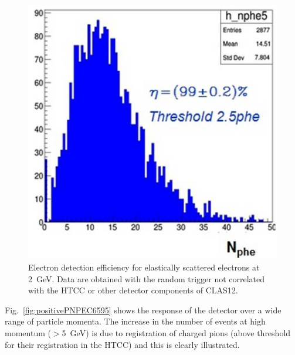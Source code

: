 \begin{figure}[!ht]
    \centering
    \includegraphics[width=1.0\linewidth,trim={0.0cm 0.0cm 0.0cm 0.0cm},clip]{images/RAFO_2GeV.jpg}
    \caption{Electron detection efficiency for elastically scattered electrons at 2~GeV. Data are obtained with the
      random trigger not correlated with the HTCC or other detector components of CLAS12.}
    \label{fig:RAFO_2GeV}
\end{figure}

Fig.~\ref{fig:positivePNPEC6595} shows the response of the detector over a wide range of particle momenta. The
increase in the number of events at high momentum ($>$5~GeV) is due to registration of charged pions (above
threshold for their registration in the HTCC) and this is clearly illustrated.

